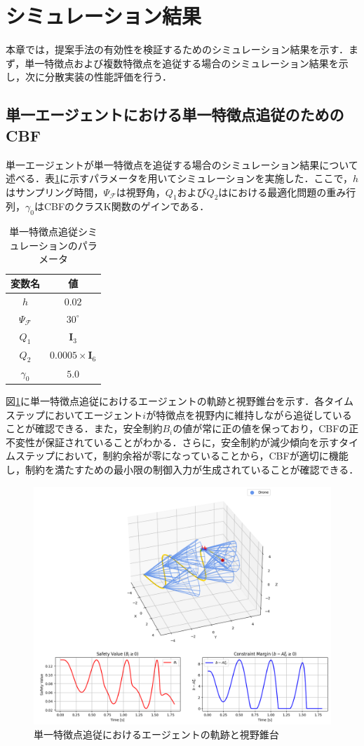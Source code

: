 \section{シミュレーション結果}

本章では，提案手法の有効性を検証するためのシミュレーション結果を示す．まず，単一特徴点および複数特徴点を追従する場合のシミュレーション結果を示し，次に分散実装の性能評価を行う．

\subsection{単一エージェントにおける単一特徴点追従のためのCBF}

単一エージェントが単一特徴点を追従する場合のシミュレーション結果について述べる．表\ref{tab:single_point_params}に示すパラメータを用いてシミュレーションを実施した．ここで，$h$はサンプリング時間，$\Psi_{\mathcal{F}}$は視野角，$Q_1$および$Q_2$はにおける最適化問題の重み行列，$\gamma_0$はCBFのクラスK関数のゲインである．

\begin{table}[htbp]
\centering
\caption{単一特徴点追従シミュレーションのパラメータ}
\label{tab:single_point_params}
\begin{tabular}{cc}
\hline
変数名 & 値 \\
\hline
$h$ & $0.02$ \\
$\Psi_{\mathcal{F}}$ & $30^{\circ}$ \\
$Q_1$ & $\mathbf{I}_3$ \\
$Q_2$ & $0.0005\times\mathbf{I}_6$ \\
$\gamma_0$ & $5.0$ \\
\hline
\end{tabular}
\end{table}

図\ref{fig:single_trajectory}に単一特徴点追従におけるエージェントの軌跡と視野錐台を示す．各タイムステップにおいてエージェント$i$が特徴点を視野内に維持しながら追従していることが確認できる．また，安全制約$B_{i}$の値が常に正の値を保っており，CBFの正不変性が保証されていることがわかる．さらに，安全制約が減少傾向を示すタイムステップにおいて，制約余裕が零になっていることから，CBFが適切に機能し，制約を満たすための最小限の制御入力が生成されていることが確認できる．

\begin{figure}[htbp]
\centering
\includegraphics[width=0.6\linewidth]{fig/point_single.png}
\caption{単一特徴点追従におけるエージェントの軌跡と視野錐台}
\label{fig:single_trajectory}
\end{figure}

